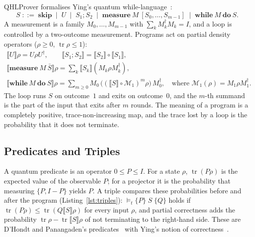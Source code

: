 \documentclass[runningheads]{llncs}
\DeclareMathOperator{\Tr}{tr}
\newcommand{\sem}[1]{\llbracket #1\rrbracket}
\newcommand{\hoaret}[3]{\models_{t}\{#1\}\;#2\;\{#3\}}
\begin{document}
QHLProver formalises Ying's quantum while-language~\cite{ying2011,ying2016book}:
\[
S \;::=\; \mathbf{skip} \;\mid\; U \;\mid\; S_1;S_2 \;\mid\; \mathbf{measure}\ M\ [S_0,\dots,S_{m-1}]
\;\mid\; \mathbf{while}\ M\ \mathbf{do}\ S .
\]
A measurement is a family $M_0,\dots,M_{m-1}$ with $\sum_kM_k^\dagger M_k=I$, and a loop is controlled
by a two-outcome measurement. Programs act on partial density operators ($\rho\ge0$,
$\Tr\rho\le1$):
\begin{gather*}
\sem{U}\rho=U\rho U^\dagger,\qquad \sem{S_1;S_2}=\sem{S_2}\circ\sem{S_1},\\
\sem{\mathbf{measure}\ M\ \bar S}\rho=\textstyle\sum_k\sem{S_k}(M_k\rho M_k^\dagger),\\
\sem{\mathbf{while}\ M\ \mathbf{do}\ S}\rho=\textstyle\sum_{m\ge0}M_0\,\bigl((\sem S\circ\mathcal
M_1)^m\rho\bigr)\,M_0^\dagger,\quad\text{where } \mathcal M_1(\rho)=M_1\rho M_1^\dagger .
\end{gather*}
The loop runs $S$ on outcome~$1$ and exits on outcome~$0$, and the $m$-th summand is the part of the
input that exits after $m$ rounds. The meaning of a program is a completely positive,
trace-non-increasing map, and the trace lost by a loop is the probability that it does not terminate.

\subsection{Predicates and Triples}

A quantum predicate is an operator $0\le P\le I$. For a state $\rho$, $\Tr(P\rho)$ is the expected
value of the observable $P$; for a projector it is the probability that measuring $\{P,I-P\}$ yields
$P$. A triple compares these probabilities before and after the program (Listing~\ref{lst:triples}):
$\hoaret PSQ$ holds if $\Tr(P\rho)\le\Tr(Q\sem S\rho)$ for every input $\rho$, and partial correctness
adds the probability $\Tr\rho-\Tr\sem S\rho$ of not terminating to the right-hand side. These are
D'Hondt and Panangaden's predicates~\cite{dhondt2006} with Ying's notion of
correctness~\cite{ying2011}.
\end{document}
